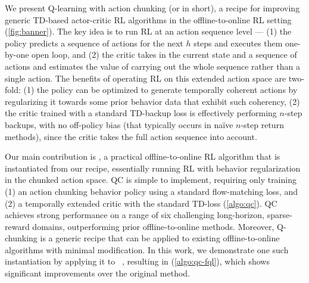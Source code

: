 We present Q-learning with action chunking (or  in short), a recipe for improving generic TD-based actor-critic RL algorithms in the offline-to-online RL setting (\cref{fig:banner}). The key idea is to run RL at an action sequence level --- (1) the policy predicts a sequence of actions for the next $h$ steps and executes them one-by-one open loop, and (2) the critic takes in the current state and a sequence of actions and estimates the value of carrying out the whole sequence rather than a single action. The benefits of operating RL on this extended action space are two-fold: (1) the policy can be optimized to generate temporally coherent actions by regularizing it towards some prior behavior data that exhibit such coherency, (2) the critic trained with a standard TD-backup loss is effectively performing $n$-step backups, with no off-policy bias (that typically occurs in na\"ive $n$-step return methods), since the critic takes the full action sequence into account.

Our main contribution is , a practical offline-to-online RL algorithm that is instantiated from our  recipe, essentially running RL with behavior regularization in the chunked action space. QC is simple to implement, requiring only training (1) an action chunking behavior policy using a standard flow-matching loss, and (2) a temporally extended critic with the standard TD-loss (\cref{algo:qc}). QC achieves strong performance on a range of six challenging long-horizon, sparse-reward domains, outperforming prior offline-to-online methods. Moreover, Q-chunking is a generic recipe that can be applied to existing offline-to-online algorithms with minimal modification. In this work, we demonstrate one such instantiation by applying it to ~\citep{park2025flow}, resulting in  (\cref{algo:qc-fql}), which shows significant improvements over the original method.





































